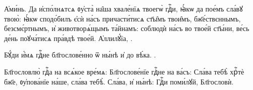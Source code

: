  А҆ми́нь. Да и҆спо́лнѧтсѧ ᲂу҆ста̀ на̑ша хвале́нїѧ  твоегѡ̀ гдⷭ҇и, ꙗ҆́кѡ да пое́мъ сла́вꙋ твою̀: ꙗ҆́кѡ  сподо́билъ є҆сѝ на́съ причасти́тисѧ ст҃ы̑мъ твои̑мъ,  бж҃е́ствєннымъ, безсмє́ртнымъ, и҆ животворѧ́щымъ та́йнамъ:  соблюдѝ на́съ во твое́й ст҃ы́ни, ве́сь де́нь поꙋча́тисѧ  пра́вдѣ твое́й. А҆ллилꙋ́їа, . 

%
 Бꙋ́ди и҆́мѧ гдⷭ҇не бл҃гослове́нно ѿ ны́нѣ и҆ до  вѣ́ка. . 

 Бл҃гословлю̀ гдⷭ҇а на всѧ́кое вре́мѧ:   
%
 Бл҃гослове́нїе гдⷭ҇не на ва́съ:  \hKv Сла́ва тебѣ̀  хрⷭ҇тѐ бж҃е, ᲂу҆пова́нїе на́ше, сла́ва тебѣ̀. 
%
 Сла́ва, и҆ ны́нѣ: \hKv Гдⷭ҇и поми́лꙋй,   Бл҃гословѝ.  

%
